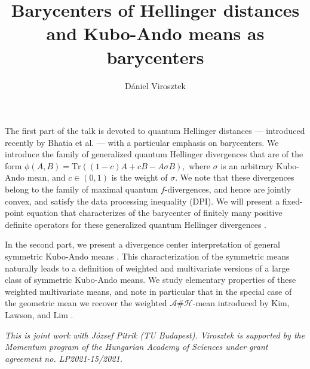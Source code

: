\documentclass[a4paper]{amsart}
\date{}
\begin{document}
\title{Barycenters of Hellinger distances and Kubo-Ando means as barycenters}
\author{D\'aniel Virosztek} %
\address{Alf\'ed R\'enyi Institute of Mathematics, Hungary} %

\maketitle

The first part of the talk is devoted to quantum Hellinger distances --- introduced recently by Bhatia et al. \cite{bhatia-paper} --- with a particular emphasis on barycenters. We introduce the family of generalized quantum Hellinger divergences that are of the form $\phi(A,B)=\mathrm{Tr} \left((1-c)A + c B - A \sigma B \right),$ where $\sigma$ is an arbitrary Kubo-Ando mean, and $c \in (0,1)$ is the weight of $\sigma.$ We note that these divergences belong to the family of maximal quantum $f$-divergences, and hence are jointly convex, and satisfy the data processing inequality (DPI). We will present a fixed-point equation that characterizes of the barycenter of finitely many positive definite operators for these generalized quantum Hellinger divergences \cite{pitrik-virosztek-hellinger}.
\par
In the second part, we present a divergence center interpretation of general symmetric Kubo-Ando means \cite{pitrik-virosztek-KA-bary}.
This characterization of the symmetric means naturally leads to a definition of weighted and multivariate versions of a large class of symmetric Kubo-Ando means. We study elementary properties of these weighted multivariate means, and note in particular that in the special case of the geometric mean we recover the weighted $\mathcal{A} \# \mathcal{H}$-mean introduced by Kim, Lawson, and Lim \cite{kim-lawson-lim}.



\emph{This is joint work with J\'ozsef Pitrik (TU Budapest).
Virosztek is supported by the Momentum program of the Hungarian Academy of Sciences under grant agreement no. LP2021-15/2021.}
\end{document}
